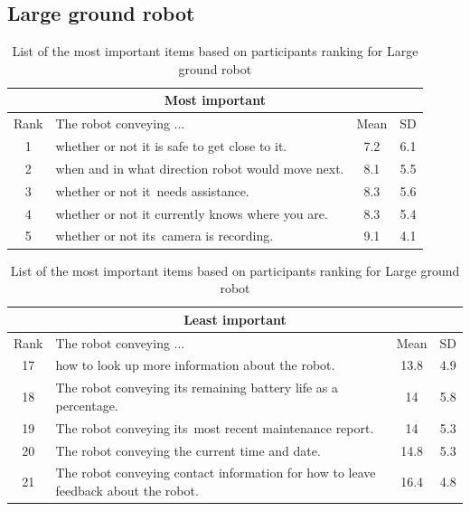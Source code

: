 \documentclass[letterpaper, 10 pt, conference]{ieeeconf}  %
\begin{document}
\subsection{Large ground robot}


\begin {table}
\begin{center}
\label{table:fetch}
\begin{tabular}{|c|p{160pt}|c|c|}
 \hline
 \multicolumn{4}{|c|}{Most important} \\
 \hline
  Rank & The robot conveying ... & Mean & SD \\
 \hline
   \rowcolor{Gray}
1 & whether or not it is safe to get close to it. & 7.2 & 6.1\\
 \hline
2 & when and in what direction robot would move next. & 8.1 & 5.5\\
 \hline
3 & whether or not it needs assistance. & 8.3 & 5.6\\
 \hline
4 & whether or not it currently knows where you are. & 8.3 & 5.4\\
 \hline
5 & whether or not its camera is recording. & 9.1 & 4.1\\
 \hline
\end{tabular}

\vspace*{0.5 cm}

\begin{tabular}{|c|p{160pt}|c|c|}
 \hline
  \multicolumn{4}{|c|}{Least important} \\
 \hline
  Rank & The robot conveying ... & Mean & SD \\
 \hline
 
   \rowcolor{Gray}
17 & how to look up more information about the robot. & 13.8 & 4.9\\
\hline
   \rowcolor{Gray}
18 & The robot conveying its remaining battery life as a percentage. & 14 & 5.8\\
\hline
   \rowcolor{Gray}
19 & The robot conveying its most recent maintenance report. & 14 & 5.3\\
\hline
   \rowcolor{Gray}
20 & The robot conveying the current time and date. & 14.8 & 5.3\\
\hline
   \rowcolor{Gray}
21 & The robot conveying contact information for how to leave feedback about the robot. & 16.4 & 4.8\\
\hline
\end{tabular}
\end{center}

\caption{List of the most important items based on participants ranking for Large ground robot}
\end{table}
\end{document}
